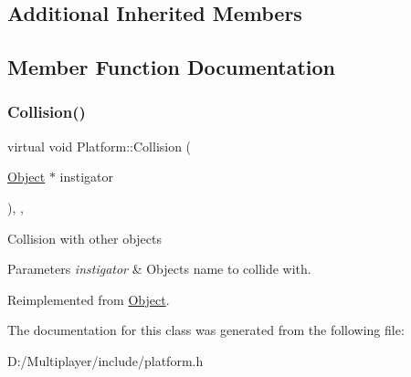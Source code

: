\subsection*{Additional Inherited Members}


\subsection{Member Function Documentation}
\mbox{\label{class_platform_abc610ede94941cb4c8423555f8faee13}} 
\subsubsection{\texorpdfstring{Collision()}{Collision()}}
{\footnotesize\ttfamily virtual void Platform\+::\+Collision (\begin{DoxyParamCaption}\item[{\hyperlink{class_object}{Object} $\ast$}]{instigator }\end{DoxyParamCaption})\hspace{0.3cm}{\ttfamily [inline]}, {\ttfamily [override]}, {\ttfamily [virtual]}}

Collision with other objects 
\begin{DoxyParams}{Parameters}
{\em instigator} & Objects name to collide with. \\
\hline
\end{DoxyParams}


Reimplemented from \hyperlink{class_object_a0af60ea226dcb885e69483452d34a47a}{Object}.



The documentation for this class was generated from the following file\+:\begin{DoxyCompactItemize}
\item 
D\+:/\+Multiplayer/include/platform.\+h\end{DoxyCompactItemize}
